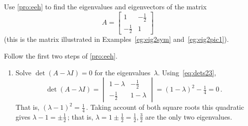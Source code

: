 \begin{example} \label{eg:2evals}
Use \autoref{pro:eeh} to find the eigenvalues and eigenvectors of the matrix
\begin{equation*}
A=\begin{bmatrix} 1&-\frac12\\-\frac12&1 \end{bmatrix}
\end{equation*}
(this is the matrix illustrated in Examples~\ref{eg:eig2sym} and~\ref{eg:eig2pic1}).
\begin{solution} Follow the first two steps of \autoref{pro:eeh}.
\begin{enumerate}
\item Solve \(\det(A-\lambda I)=0\) for the eigenvalues~\(\lambda\).
Using~\eqref{eq:dets23},
\begin{equation*}
\det(A-\lambda I)=\begin{vmatrix} 1-\lambda&-\frac12\\
-\frac12&1-\lambda \end{vmatrix}
=(1-\lambda)^2-\tfrac14=0\,.
\end{equation*}
That is, \((\lambda-1)^2=\frac14\)\,.  Taking account of both square roots this quadratic gives \(\lambda-1=\pm\frac12\)\,; that is, \(\lambda=1\pm\frac12=\frac12,\frac32\) are the only two eigenvalues.


\end{enumerate}
\end{solution}
\end{example}
